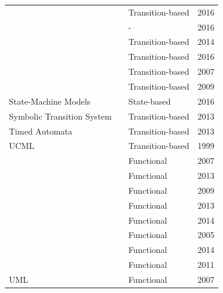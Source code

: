 \documentclass{report}
\begin{document}
\begin{table}[!h]
\begin{tabular}{|l|l|l|l|}
                                        & \cite{Ganesan2016}      & Transition-based     & 2016          \\ \cline{2-4} 
                                        & \cite{SanMiguel2016}    & -                    & 2016          \\ \cline{2-4} 
                                        & \cite{Arantes2014}      & Transition-based     & 2014          \\ \cline{2-4} 
                                        & \cite{Gay2016}          & Transition-based     & 2016          \\ \cline{2-4} 
                                        & \cite{Hessel2007}       & Transition-based     & 2007          \\ \cline{2-4} 
                                        & \cite{Hierons2009}      & Transition-based     & 2009          \\ \cline{2-4} 
\multirow{-9}{*}{State-Machine Models}  & \cite{Jeong2016}        & State-based          & 2016          \\ \hline
Symbolic Transition System              & \cite{Anisetti2013}     & Transition-based     & 2013          \\ \hline
Timed Automata                          & \cite{Anand2013}        & Transition-based     & 2013          \\ \hline
UCML                                    & \cite{Barber1999}       & Transition-based     & 1999          \\ \hline
                                        & \cite{XinyingCai2007}   & Functional           & 2007          \\ \cline{2-4} 
                                        & \cite{Shirole2013}      & Functional           & 2013          \\ \cline{2-4} 
                                        & \cite{Rauf2009}         & Functional           & 2009          \\ \cline{2-4} 
                                        & \cite{Schaefer2013}     & Functional           & 2013          \\ \cline{2-4} 
                                        & \cite{Paper2014}        & Functional           & 2014          \\ \cline{2-4} 
                                        & \cite{Kim2005}          & Functional           & 2005          \\ \cline{2-4} 
                                        & \cite{Rodrigues2014}    & Functional           & 2014          \\ \cline{2-4} 
                                        & \cite{Silveira2011}     & Functional           & 2011          \\ \cline{2-4} 
\multirow{-9}{*}{UML}                   & \cite{Lenz2007}         & Functional           & 2007          \\ \hline
\end{tabular}
\end{table}
\end{document}
